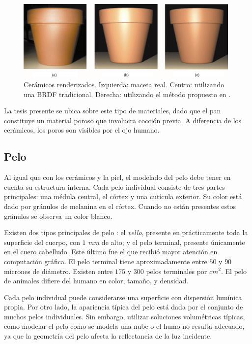 \begin{figure}
\center
\includegraphics[width=11cm]{figures/ceramico}
\caption[Cerámicos renderizados]{Cerámicos renderizados. Izquierda: maceta real. Centro: utilizando una BRDF tradicional. Derecha: utilizando el método propuesto en \cite{Merillou2000}.}
\label{fg:ceramico}
\end{figure}

La tesis presente se ubica sobre este tipo de materiales, dado que el pan constituye un material poroso que involucra cocción previa.
A diferencia de los cerámicos, los poros son visibles por el ojo humano.

\subsection{Pelo}
Al igual que con los cerámicos y la piel, el modelado del pelo debe tener en cuenta su estructura interna.
Cada pelo individual consiste de tres partes principales: una médula central, el córtex y una cutícula exterior.
Su color está dado por gránulos de melanina en el córtex.
Cuando no están presentes estos gránulos se observa un color blanco.


Existen dos tipos principales de pelo : el {\em vello}, presente en prácticamente toda la superficie del cuerpo, con $1$ {\em mm} de alto; y el {pelo terminal}, presente únicamente en el cuero cabelludo.
Este último fue el que recibió mayor atención en computación gráfica.
El pelo terminal tiene aproximadamente entre $50$ y $90$ micrones de diámetro.
Existen entre $175$ y $300$ pelos terminales por {\em $cm^{2}$}.
El pelo de animales difiere del humano en color, tamaño, y densidad.

Cada pelo individual puede considerarse una superficie con dispersión lumínica propia.
Por otro lado, la apariencia típica del pelo está dada por el conjunto de muchos pelos individuales.
Sin embargo, utilizar soluciones volumétricas típicas, como modelar el pelo como se modela una nube o el humo no resulta adecuado, ya que la geometría del pelo afecta la reflectancia de la luz incidente.

